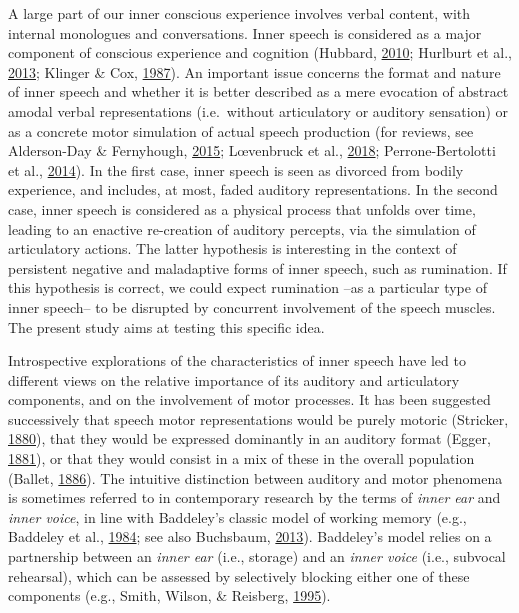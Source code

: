 \documentclass[a4paper,12pt,twoside,onecolumn,openright,final,oldfontcommands]{memoir}
\begin{document}
A large part of our inner conscious experience involves verbal content, with internal monologues and conversations. Inner speech is considered as a major component of conscious experience and cognition (Hubbard, \protect\hyperlink{ref-hubbard_auditory_2010}{2010}; Hurlburt et al., \protect\hyperlink{ref-Hurlburt2013}{2013}; Klinger \& Cox, \protect\hyperlink{ref-klinger_dimensions_1987}{1987}). An important issue concerns the format and nature of inner speech and whether it is better described as a mere evocation of abstract amodal verbal representations (i.e.~without articulatory or auditory sensation) or as a concrete motor simulation of actual speech production (for reviews, see Alderson-Day \& Fernyhough, \protect\hyperlink{ref-alderson-day_inner_2015}{2015}; Lœvenbruck et al., \protect\hyperlink{ref-loevenbruck_cognitive_2018}{2018}; Perrone-Bertolotti et al., \protect\hyperlink{ref-Perrone-Bertolotti2014}{2014}). In the first case, inner speech is seen as divorced from bodily experience, and includes, at most, faded auditory representations. In the second case, inner speech is considered as a physical process that unfolds over time, leading to an enactive re-creation of auditory percepts, via the simulation of articulatory actions. The latter hypothesis is interesting in the context of persistent negative and maladaptive forms of inner speech, such as rumination. If this hypothesis is correct, we could expect rumination --as a particular type of inner speech-- to be disrupted by concurrent involvement of the speech muscles. The present study aims at testing this specific idea.

Introspective explorations of the characteristics of inner speech have led to different views on the relative importance of its auditory and articulatory components, and on the involvement of motor processes. It has been suggested successively that speech motor representations would be purely motoric (Stricker, \protect\hyperlink{ref-stricker_studien_1880}{1880}), that they would be expressed dominantly in an auditory format (Egger, \protect\hyperlink{ref-egger_parole_1881}{1881}), or that they would consist in a mix of these in the overall population (Ballet, \protect\hyperlink{ref-ballet_langage_1886}{1886}). The intuitive distinction between auditory and motor phenomena is sometimes referred to in contemporary research by the terms of \emph{inner ear} and \emph{inner voice}, in line with Baddeley's classic model of working memory (e.g., Baddeley et al., \protect\hyperlink{ref-baddeley_exploring_1984}{1984}; see also Buchsbaum, \protect\hyperlink{ref-buchsbaum_role_2013}{2013}). Baddeley's model relies on a partnership between an \emph{inner ear} (i.e., storage) and an \emph{inner voice} (i.e., subvocal rehearsal), which can be assessed by selectively blocking either one of these components (e.g., Smith, Wilson, \& Reisberg, \protect\hyperlink{ref-smith_role_1995}{1995}).
\end{document}
